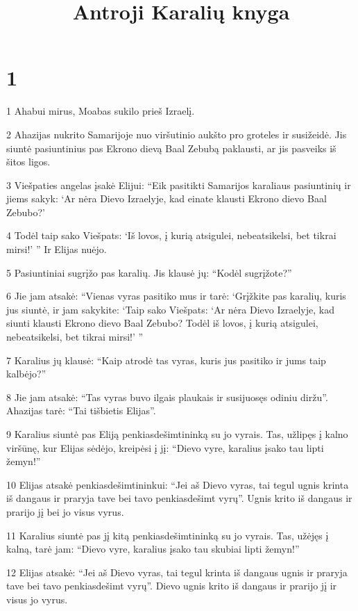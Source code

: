 

\title{Antroji Karalių knyga}

\chapter{1}

\par 1 Ahabui mirus, Moabas sukilo prieš Izraelį. 
\par 2 Ahazijas nukrito Samarijoje nuo viršutinio aukšto pro groteles ir susižeidė. Jis siuntė pasiuntinius pas Ekrono dievą Baal Zebubą paklausti, ar jis pasveiks iš šitos ligos. 
\par 3 Viešpaties angelas įsakė Elijui: “Eik pasitikti Samarijos karaliaus pasiuntinių ir jiems sakyk: ‘Ar nėra Dievo Izraelyje, kad einate klausti Ekrono dievo Baal Zebubo?’ 
\par 4 Todėl taip sako Viešpats: ‘Iš lovos, į kurią atsigulei, nebeatsikelsi, bet tikrai mirsi!’ ” Ir Elijas nuėjo. 
\par 5 Pasiuntiniai sugrįžo pas karalių. Jis klausė jų: “Kodėl sugrįžote?” 
\par 6 Jie jam atsakė: “Vienas vyras pasitiko mus ir tarė: ‘Grįžkite pas karalių, kuris jus siuntė, ir jam sakykite: ‘Taip sako Viešpats: ‘Ar nėra Dievo Izraelyje, kad siunti klausti Ekrono dievo Baal Zebubo? Todėl iš lovos, į kurią atsigulei, nebeatsikelsi, bet tikrai mirsi!’ ” 
\par 7 Karalius jų klausė: “Kaip atrodė tas vyras, kuris jus pasitiko ir jums taip kalbėjo?” 
\par 8 Jie jam atsakė: “Tas vyras buvo ilgais plaukais ir susijuosęs odiniu diržu”. Ahazijas tarė: “Tai tišbietis Elijas”. 
\par 9 Karalius siuntė pas Eliją penkiasdešimtininką su jo vyrais. Tas, užlipęs į kalno viršūnę, kur Elijas sėdėjo, kreipėsi į jį: “Dievo vyre, karalius įsako tau lipti žemyn!” 
\par 10 Elijas atsakė penkiasdešimtininkui: “Jei aš Dievo vyras, tai tegul ugnis krinta iš dangaus ir praryja tave bei tavo penkiasdešimt vyrų”. Ugnis krito iš dangaus ir prarijo jį bei jo visus vyrus. 
\par 11 Karalius siuntė pas jį kitą penkiasdešimtininką su jo vyrais. Tas, užėjęs į kalną, tarė jam: “Dievo vyre, karalius įsako tau skubiai lipti žemyn!” 
\par 12 Elijas atsakė: “Jei aš Dievo vyras, tai tegul krinta iš dangaus ugnis ir praryja tave bei tavo penkiasdešimt vyrų”. Dievo ugnis krito iš dangaus ir prarijo jį ir visus jo vyrus. 
